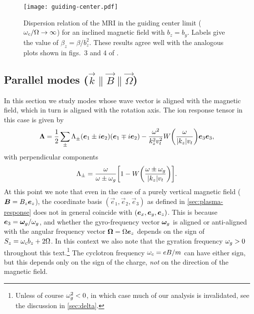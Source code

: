 \documentclass[aps,pre,notitlepage,amsmath,amssymb,amsfonts,nobibnotes,nofootinbib,superscriptaddress]{revtex4-1}
\begin{document}
\begin{figure}
  \centering\texttt{[image: guiding-center.pdf]}
  \caption{Dispersion relation of the MRI in the guiding center limit
    ($\omega_c/\Omega\to\infty$) for an inclined magnetic field with $b_z=b_y$.
    Labels give the value of $\beta_z=\beta/b_z^2$. These results agree well
    with the analogous plots shown in figs.~3 and 4 of
    \citet{Quataert2002}.}\label{fig:guiding-center}
\end{figure}

\subsection{Parallel modes
  ($\vec{k}\bm{\parallel}\vec{B}\bm{\parallel}\vec{\Omega}$)}
\label{sec:par}

In this section we study modes whose wave vector is aligned with the magnetic
field, which in turn is aligned with the rotation axis. The ion response
tensor in this case is given by
\begin{equation}
  \label{eq:parallel-response}
  \mathbf{\Lambda} =
  \frac{1}{2}\sum_\pm\Lambda^{}_\pm
  (\vec{e}_1\pm i\vec{e}_2)(\vec{e}_1\mp i\vec{e}_2)
  - \frac{\omega^2}{k_z^2\vt^2} W\left(\frac{\omega}{|k_z|\vt}\right)
  \vec{e}_3\vec{e}_3,
\end{equation}
with perpendicular components
\begin{equation}
  \label{eq:circular-components}
  \Lambda_\pm = \frac{\omega}{\omega\pm\omg}
  \left[1 - W\left(\frac{\omega\pm\omg}{|k_z|\vt}\right)\right].
\end{equation}
At this point we note that even in the case of a purely vertical magnetic
field ($\bm{B}=B_z\bm{e}_z$), the coordinate basis
$(\vec{e}_1,\vec{e}_2,\vec{e}_3)$ as defined in \cref{sec:plasma-response}
does not in general coincide with $(\bm{e}_x,\bm{e}_y,\bm{e}_z)$. This is because
$\bm{e}_3=\bm{\omega}_g/\omega_g$, and whether the gyro-frequency vector $\bm{\omega}_g$ is
aligned or anti-aligned with the angular frequency vector
$\bm{\Omega}=\Omega\bm{e}_z$ depends on the sign of $S_z=\omega_c{}b_z+2\Omega$. In
this context we also note that the gyration frequency $\omega_g>0$ throughout this
text.\footnote{Unless of course $\omega_g^2<0$, in which case much of our analysis
  is invalidated, see the discussion in \cref{sec:delta}.} The cyclotron
frequency $\omega_c=eB/m$ can have either sign, but this depends only on the sign
of the charge, \emph{not} on the direction of the magnetic field.
\end{document}
